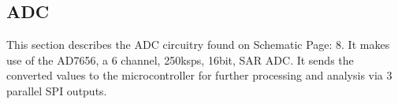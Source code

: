 \subsection{ADC}

This section describes the ADC circuitry found on Schematic Page: 8. It makes use of the AD7656, a 6 channel, 250ksps, 16bit, SAR ADC. It sends the converted values to the microcontroller for further processing and analysis via 3 parallel SPI outputs.

